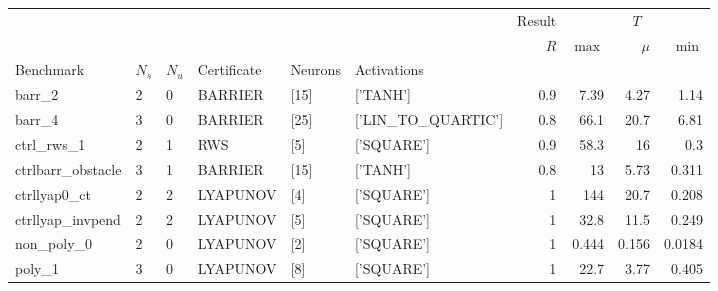 \begin{tabular}{llllllrrrr}
    \toprule
                       &       &       &             &         &                      & Result & \multicolumn{3}{c}{$T$}                  \\
                       &       &       &             &         &                      & $R$    & $\max$                  & $\mu$ & $\min$ \\
    Benchmark          & $N_s$ & $N_u$ & Certificate & Neurons & Activations          &        &                         &       &        \\
    \midrule
    barr\_2            & 2     & 0     & BARRIER     & [15]    & ['TANH']             & 0.9    & 7.39                    & 4.27  & 1.14   \\
    \cline{1-10} \cline{2-10} \cline{3-10} \cline{4-10} \cline{5-10}
    barr\_4            & 3     & 0     & BARRIER     & [25]    & ['LIN\_TO\_QUARTIC'] & 0.8    & 66.1                    & 20.7  & 6.81   \\
    \cline{1-10} \cline{2-10} \cline{3-10} \cline{4-10} \cline{5-10}
    ctrl\_rws\_1       & 2     & 1     & RWS         & [5]     & ['SQUARE']           & 0.9    & 58.3                    & 16    & 0.3    \\
    \cline{1-10} \cline{2-10} \cline{3-10} \cline{4-10} \cline{5-10}
    ctrlbarr\_obstacle & 3     & 1     & BARRIER     & [15]    & ['TANH']             & 0.8    & 13                      & 5.73  & 0.311  \\
    \cline{1-10} \cline{2-10} \cline{3-10} \cline{4-10} \cline{5-10}
    ctrllyap0\_ct      & 2     & 2     & LYAPUNOV    & [4]     & ['SQUARE']           & 1      & 144                     & 20.7  & 0.208  \\
    \cline{1-10} \cline{2-10} \cline{3-10} \cline{4-10} \cline{5-10}
    ctrllyap\_invpend  & 2     & 2     & LYAPUNOV    & [5]     & ['SQUARE']           & 1      & 32.8                    & 11.5  & 0.249  \\
    \cline{1-10} \cline{2-10} \cline{3-10} \cline{4-10} \cline{5-10}
    non\_poly\_0       & 2     & 0     & LYAPUNOV    & [2]     & ['SQUARE']           & 1      & 0.444                   & 0.156 & 0.0184 \\
    \cline{1-10} \cline{2-10} \cline{3-10} \cline{4-10} \cline{5-10}
    poly\_1            & 3     & 0     & LYAPUNOV    & [8]     & ['SQUARE']           & 1      & 22.7                    & 3.77  & 0.405  \\
    \cline{1-10} \cline{2-10} \cline{3-10} \cline{4-10} \cline{5-10}

\end{tabular}
